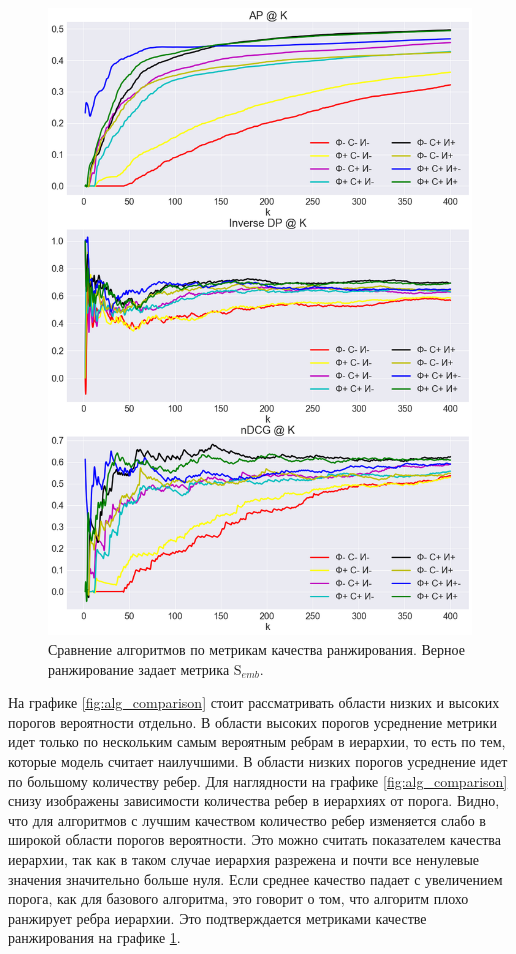 \begin{figure}
    \centering 
    \includegraphics[width=1\textwidth]{img/ranking_alg_comparison.png}
    \caption{\label{fig:rank_comparison} Сравнение алгоритмов по метрикам качества ранжирования. Верное ранжирование задает метрика $\mathrm{S}_{emb}$.}
\end{figure}

На графике \ref{fig:alg_comparison} стоит рассматривать области низких и высоких порогов вероятности отдельно. В области высоких порогов усреднение метрики идет только по нескольким самым вероятным ребрам в иерархии, то есть по тем, которые модель считает наилучшими. В области низких порогов усреднение идет по большому количеству ребер. Для наглядности на графике \ref{fig:alg_comparison} снизу изображены зависимости количества ребер в иерархиях от порога. Видно, что для алгоритмов с лучшим качеством количество ребер изменяется слабо в широкой области порогов вероятности. Это можно считать показателем качества иерархии, так как в таком случае иерархия разрежена и почти все ненулевые значения значительно больше нуля. Если среднее качество падает с увеличением порога, как для базового алгоритма, это говорит о том, что алгоритм плохо ранжирует ребра иерархии. Это подтверждается метриками качестве ранжирования на графике \ref{fig:rank_comparison}.

